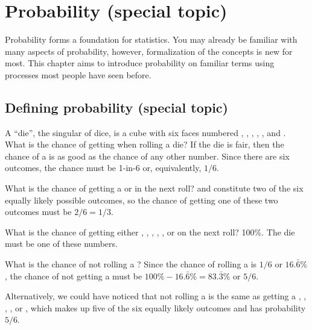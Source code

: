 \chapter{Probability (special topic)}
\label{probability}

Probability forms a foundation for statistics. You may already be familiar with many aspects of probability, however, formalization of the concepts is new for most. This chapter aims to introduce probability on familiar terms using processes most people have seen before.

\vspace{5mm}

\section{Defining probability (special topic)}
\label{basicsOfProbability}

\begin{example}{A ``die'', the singular of dice, is a cube with six faces numbered , , , , , and . What is the chance of getting  when rolling a die?}\label{probOf1}
If the die is fair, then the chance of a  is as good as the chance of any other number. Since there are six outcomes, the chance must be 1-in-6 or, equivalently, $1/6$.
\end{example}

\begin{example}{What is the chance of getting a  or  in the next roll?}\label{probOf1Or2}
 and  constitute two of the six equally likely possible outcomes, so the chance of getting one of these two outcomes must be $2/6 = 1/3$.
\end{example}

\begin{example}{What is the chance of getting either , , , , , or  on the next roll?}\label{probOf123456}
100\%. The die must be one of these numbers.
\end{example}

\begin{example}{What is the chance of not rolling a ?}\label{probNot2}
Since the chance of rolling a  is $1/6$ or $16.\bar{6}\%$, the chance of not getting a  must be $100\% - 16.\bar{6}\%=83.\bar{3}\%$ or $5/6$.

Alternatively, we could have noticed that not rolling a  is the same as getting a , , , , or , which makes up five of the six equally likely outcomes and has probability $5/6$.
\end{example}

